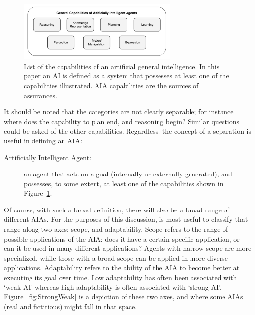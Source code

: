 	\begin{figure}[htbp]
    	\centering
     	\includegraphics[width=0.7\textwidth]{Figures/AI_capabilities}
    	\caption{List of the capabilities of an artificial general intelligence. In this paper an AI is defined as a system that possesses at least one of the capabilities illustrated. AIA capabilities are the sources of assurances.}
        \label{fig:AIcapabilities}
    \end{figure}

    It should be noted that the categories are not clearly separable; for instance where does the capability to plan end, and reasoning begin? Similar questions could be asked of the other capabilities. Regardless, the concept of a separation is useful in defining an AIA:
    
    \begin{description}
        \item[Artificially Intelligent Agent:] an agent that acts on a goal (internally or externally generated), and possesses, to some extent, at least one of the capabilities shown in Figure~\ref{fig:AIcapabilities}.
    \end{description}

    Of course, with such a broad definition, there will also be a broad range of different AIAs. For the purposes of this discussion, is most useful to classify that range along two axes: scope, and adaptability. Scope refers to the range of possible applications of the AIA: does it have a certain specific application, or can it be used in many different applications? Agents with narrow scope are more specialized, while those with a broad scope can be applied in more diverse applications. Adaptability refers to the ability of the AIA to become better at executing its goal over time. Low adaptability has often been associated with `weak AI' whereas high adaptability is often associated with `strong AI'. Figure~\ref{fig:StrongWeak} is a depiction of these two axes, and where some AIAs (real and fictitious) might fall in that space.


